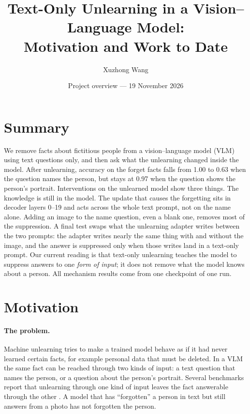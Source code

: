 \documentclass[11pt]{article}
\title{Text-Only Unlearning in a Vision--Language Model:\\
Motivation and Work to Date}
\author{Xuzhong Wang}
\date{Project overview --- 19 November 2026}
\begin{document}
\maketitle

\section{Summary}
We remove facts about fictitious people from a vision--language model (VLM) using text
questions only, and then ask what the unlearning changed inside the model. After
unlearning, accuracy on the forget facts falls from 1.00 to 0.63 when the question names the
person, but stays at 0.97 when the question shows the person's portrait. Interventions on
the unlearned model show three things. The knowledge is still in the model. The update
that causes the forgetting sits in decoder layers 0--19 and acts across the whole text
prompt, not on the name alone. Adding an image to the name question, even a blank one,
removes most of the suppression. A final test swaps what the unlearning adapter writes
between the two prompts: the adapter writes nearly the same thing with and without the
image, and the answer is suppressed only when those writes land in a text-only prompt. Our
current reading is that text-only unlearning teaches the model to suppress answers to one
\emph{form of input}; it does not remove what the model knows about a person. All
mechanism results come from one checkpoint of one run.

\section{Motivation}
\paragraph{The problem.} Machine unlearning tries to make a trained model behave as if it
had never learned certain facts, for example personal data that must be deleted. In a VLM
the same fact can be reached through two kinds of input: a text question that names the
person, or a question about the person's portrait. Several benchmarks report that
unlearning through one kind of input leaves the fact answerable through the other
\cite{umubench,unlinkvl,smu,idunlearn}. A model that has ``forgotten'' a person in text
but still answers from a photo has not forgotten the person.
\end{document}
